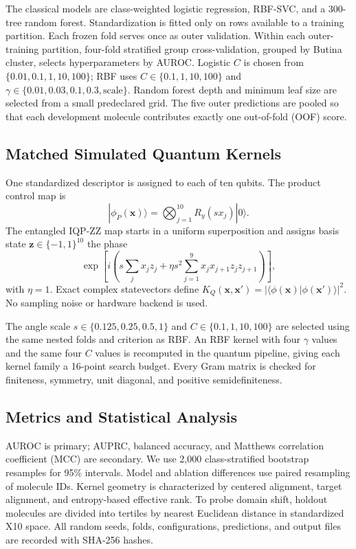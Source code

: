 \documentclass[conference]{IEEEtran}
\begin{document}
The classical models are class-weighted logistic regression, RBF-SVC, and a
300-tree random forest. Standardization is fitted only on rows available to a
training partition. Each frozen fold serves once as outer validation. Within
each outer-training partition, four-fold stratified group cross-validation,
grouped by Butina cluster, selects hyperparameters by AUROC. Logistic $C$ is
chosen from $\{0.01,0.1,1,10,100\}$; RBF uses
$C\in\{0.1,1,10,100\}$ and
$\gamma\in\{0.01,0.03,0.1,0.3,\text{scale}\}$. Random forest depth and minimum
leaf size are selected from a small predeclared grid. The five outer
predictions are pooled so that each development molecule contributes exactly
one out-of-fold (OOF) score.

\subsection{Matched Simulated Quantum Kernels}

One standardized descriptor is assigned to each of ten qubits. The product
control map is
\begin{equation}
 |\phi_P(\mathbf{x})\rangle=\bigotimes_{j=1}^{10}
 R_y(sx_j)|0\rangle .
\end{equation}
The entangled IQP-ZZ map starts in a uniform superposition and assigns basis
state $\mathbf{z}\in\{-1,1\}^{10}$ the phase
\begin{equation}
 \exp\!\left[i\left(s\sum_j x_jz_j +
 \eta s^2\sum_{j=1}^{9}x_jx_{j+1}z_jz_{j+1}\right)\right],
\end{equation}
with $\eta=1$. Exact complex statevectors define
$K_Q(\mathbf{x},\mathbf{x}')=|\langle\phi(\mathbf{x})|
\phi(\mathbf{x}')\rangle|^2$. No sampling noise or hardware backend is used.

The angle scale $s\in\{0.125,0.25,0.5,1\}$ and
$C\in\{0.1,1,10,100\}$ are selected using the same nested folds and criterion
as RBF. An RBF kernel with four $\gamma$ values and the same four $C$ values is
recomputed in the quantum pipeline, giving each kernel family a 16-point
search budget. Every Gram matrix is checked for finiteness, symmetry, unit
diagonal, and positive semidefiniteness.

\subsection{Metrics and Statistical Analysis}

AUROC is primary; AUPRC, balanced accuracy, and Matthews correlation
coefficient (MCC) are secondary. We use 2,000 class-stratified bootstrap
resamples for 95\% intervals. Model and ablation differences use paired
resampling of molecule IDs. Kernel geometry is characterized by centered
alignment, target alignment, and entropy-based effective rank. To probe
domain shift, holdout molecules are divided into tertiles by nearest Euclidean
distance in standardized X10 space. All random seeds, folds, configurations,
predictions, and output files are recorded with SHA-256 hashes.
\end{document}
